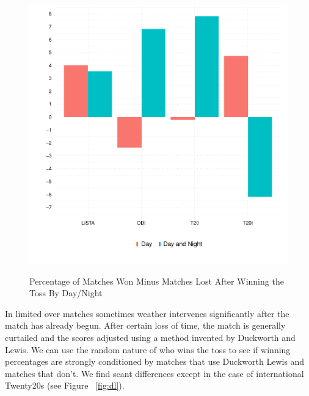 \documentclass[11pt]{article}
\begin{document}
\begin{figure}[htbp]
\centering
\caption{Percentage of Matches Won Minus Matches Lost After Winning the Toss By Day/Night}
\includegraphics[scale=.85]{../figs/winbyDayNight.pdf}
\label{fig:dn}
\end{figure}

In limited over matches sometimes weather intervenes significantly after the match has already begun. After certain loss of time, the match is generally curtailed and the scores adjusted using a method invented by Duckworth and Lewis. We can use the random nature of who wins the toss to see if winning percentages are strongly conditioned by matches that use Duckworth Lewis and matches that don't. We find scant differences except in the case of international Twenty20s (see Figure ~\ref{fig:dl}).
\end{document}
